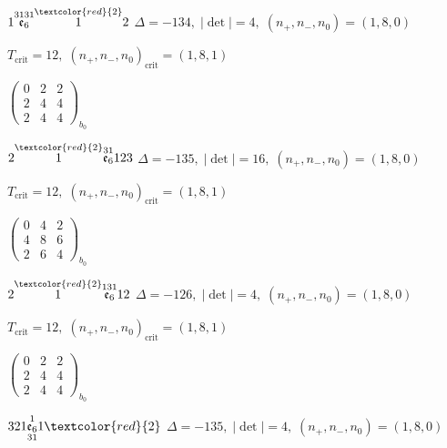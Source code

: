 \documentclass[10pt]{article}
\begin{document}
\smallskip

$1\overset{3131}{\mathfrak{e}_6}\overset{\textcolor{red}{2}}{1}2$ \quad $\Delta=-134,\; |\det|=4,\; (n_+,n_-,n_0)=(1,8,0)$

\hspace{1em}$T_{\text{crit}}=12,\; (n_+,n_-,n_0)_{\text{crit}}=(1,8,1)$

\hspace{2em}$\left(\begin{smallmatrix}0 & 2 & 2 \\ 2 & 4 & 4 \\ 2 & 4 & 4\end{smallmatrix}\right)_{\!b_0}$

\smallskip

$2\overset{\textcolor{red}{2}}{1}\overset{31}{\mathfrak{e}_6}123$ \quad $\Delta=-135,\; |\det|=16,\; (n_+,n_-,n_0)=(1,8,0)$

\hspace{1em}$T_{\text{crit}}=12,\; (n_+,n_-,n_0)_{\text{crit}}=(1,8,1)$

\hspace{2em}$\left(\begin{smallmatrix}0 & 4 & 2 \\ 4 & 8 & 6 \\ 2 & 6 & 4\end{smallmatrix}\right)_{\!b_0}$

\smallskip

$2\overset{\textcolor{red}{2}}{1}\overset{131}{\mathfrak{e}_6}12$ \quad $\Delta=-126,\; |\det|=4,\; (n_+,n_-,n_0)=(1,8,0)$

\hspace{1em}$T_{\text{crit}}=12,\; (n_+,n_-,n_0)_{\text{crit}}=(1,8,1)$

\hspace{2em}$\left(\begin{smallmatrix}0 & 2 & 2 \\ 2 & 4 & 4 \\ 2 & 4 & 4\end{smallmatrix}\right)_{\!b_0}$

\smallskip

$321\overset{1}{\underset{31}{\mathfrak{e}_6}}1\textcolor{red}{2}$ \quad $\Delta=-135,\; |\det|=4,\; (n_+,n_-,n_0)=(1,8,0)$
\end{document}
